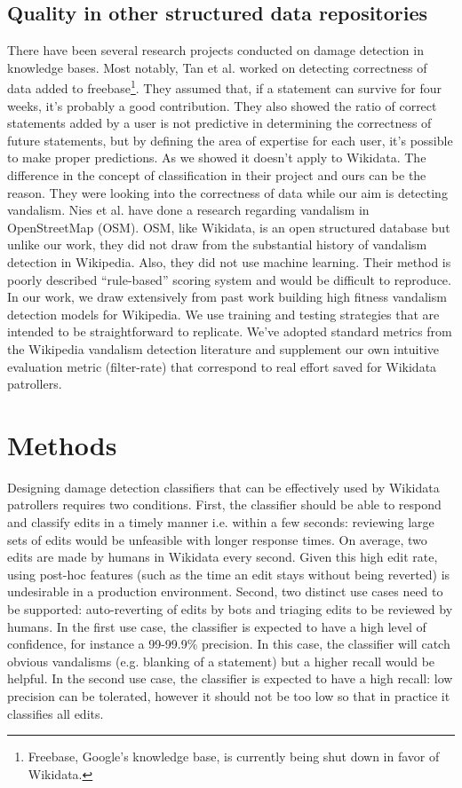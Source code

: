 \documentclass{sig-alternate}
\begin{document}
\subsection{Quality in other structured data repositories}
There have been several research projects conducted on damage detection in knowledge bases. Most notably, Tan et al. \cite{tan:trust} worked on detecting correctness of data added to freebase\footnote{Freebase, Google's knowledge base, is currently being shut down in favor of Wikidata.}. They assumed that, if a statement can survive for four weeks, it's probably a good contribution.  They also showed the ratio of correct statements added by a user is not predictive in determining the correctness of future statements, but by defining the area of expertise for each user, it's possible to make proper predictions. As we showed it doesn't apply to Wikidata. The difference in the concept of classification in their project and ours can be the reason. They were looking into the correctness of data while our aim is detecting vandalism. Nies et al. \cite{neis:towards} have done a research regarding vandalism in OpenStreetMap (OSM). OSM, like Wikidata, is an open structured database but unlike our work, they did not draw from the substantial history of vandalism detection in Wikipedia. Also, they did not use machine learning. Their method is poorly described ``rule-based'' scoring system and would be difficult to reproduce. In our work, we draw extensively from past work building high fitness vandalism detection models for Wikipedia. We use training and testing strategies that are intended to be straightforward to replicate.  We've adopted standard metrics from the Wikipedia vandalism detection literature and supplement our own intuitive evaluation metric (filter-rate) that correspond to real effort saved for Wikidata patrollers.

\section{Methods}
Designing damage detection classifiers that can be effectively used by Wikidata patrollers requires two conditions. First, the classifier should be able to respond and classify edits in a timely manner i.e. within a few seconds: reviewing large sets of edits would be unfeasible with longer response times. On average, two edits are made by humans in Wikidata every second. Given this high edit rate, using post-hoc features (such as the time an edit stays without being reverted) is undesirable in a production environment. Second, two distinct use cases need to be supported: auto-reverting of edits by bots and triaging edits to be reviewed by humans. In the first use case, the classifier is expected to have a high level of confidence, for instance a 99-99.9\% precision. In this case, the classifier will catch obvious vandalisms (e.g. blanking of a statement) but a higher recall would be helpful. In the second use case, the classifier is expected to have a high recall: low precision can be tolerated, however it should not be too low so that in practice it classifies all edits.
\end{document}
